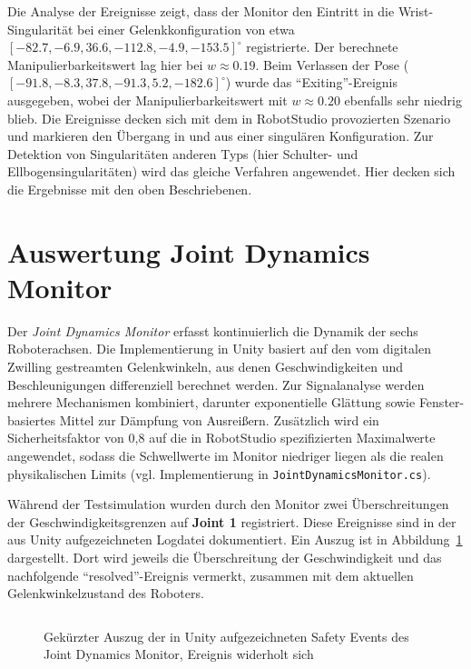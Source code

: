 Die Analyse der Ereignisse zeigt, dass der Monitor den Eintritt in die Wrist-Singularität
bei einer Gelenkkonfiguration von etwa
$[-82.7, -6.9, 36.6, -112.8, -4.9, -153.5]^\circ$ registrierte. Der berechnete
Manipulierbarkeitswert lag hier bei $w \approx 0.19$. Beim Verlassen der Pose
($[-91.8, -8.3, 37.8, -91.3, 5.2, -182.6]^\circ$) wurde das \enquote{Exiting}-Ereignis
ausgegeben, wobei der Manipulierbarkeitswert mit $w \approx 0.20$ ebenfalls sehr niedrig blieb.
Die Ereignisse decken sich mit dem in RobotStudio provozierten Szenario und markieren den
Übergang in und aus einer singulären Konfiguration.
Zur Detektion von Singularitäten anderen Typs (hier Schulter- und
Ellbogensingularitäten) wird das gleiche Verfahren angewendet. Hier decken sich
die Ergebnisse mit den oben Beschriebenen.

\section{Auswertung Joint Dynamics Monitor}
\label{sec:Analyse_Sicherheit}

Der \textit{Joint Dynamics Monitor} erfasst kontinuierlich die Dynamik der sechs Roboterachsen.
Die Implementierung in Unity basiert auf den vom digitalen Zwilling gestreamten Gelenkwinkeln,
aus denen Geschwindigkeiten und Beschleunigungen differenziell berechnet werden.
Zur Signalanalyse werden mehrere Mechanismen kombiniert, darunter exponentielle Glättung
sowie Fenster-basiertes Mittel zur Dämpfung von Ausreißern. Zusätzlich wird ein
Sicherheitsfaktor von 0{,}8 auf die in RobotStudio spezifizierten Maximalwerte angewendet,
sodass die Schwellwerte im Monitor niedriger liegen als die realen physikalischen Limits
(vgl. Implementierung in \texttt{JointDynamicsMonitor.cs}).

Während der Testsimulation wurden durch den Monitor zwei Überschreitungen der
Geschwindigkeitsgrenzen auf \textbf{Joint 1} registriert. Diese Ereignisse sind
in der aus Unity aufgezeichneten Logdatei dokumentiert. Ein Auszug ist in
Abbildung~\ref{lst:jointdynamics_json} dargestellt. Dort wird jeweils die
Überschreitung der Geschwindigkeit und das nachfolgende
\enquote{resolved}-Ereignis vermerkt, zusammen mit dem aktuellen
Gelenkwinkelzustand des Roboters.

\begin{figure}[H]
	\inputminted[fontsize=\footnotesize,breaklines]{json}{code-snippets/jointdynamicserror.json}
	\caption{Gekürzter Auszug der in Unity aufgezeichneten Safety Events des Joint Dynamics Monitor, Ereignis widerholt sich}
	\label{lst:jointdynamics_json}
\end{figure}

